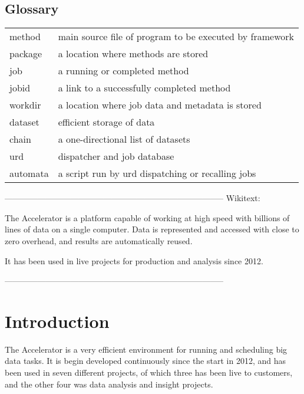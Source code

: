 \documentclass[a4paper]{report}
\begin{document}
\titleLL
\newpage




\section*{Glossary}

\begin{tabular*}{\textwidth}{ll}
method    & main source file of program to be executed by framework\\
package   & a location where methods are stored\\
job       & a running or completed method\\
jobid     & a link to a successfully completed method\\
workdir   & a location where job data and metadata is stored\\
dataset   & efficient storage of data\\
chain     & a one-directional list of datasets\\
urd       & dispatcher and job database\\
automata  & a script run by urd dispatching or recalling jobs\\
\end{tabular*}

--------------------------------------------------------------------------------
Wikitext:

The Accelerator is a platform capable of working at high speed with
billions of lines of data on a single computer.  Data is represented
and accessed with close to zero overhead, and results are
automatically reused.

It has been used in live projects for production and analysis since
2012.

--------------------------------------------------------------------------------

\chapter{Introduction}

The Accelerator is a very efficient environment for running and
scheduling big data tasks.  It is begin developed continuously since
the start in 2012, and has been used in seven different projects, of
which three has been live to customers, and the other four was data
analysis and insight projects.
\end{document}
